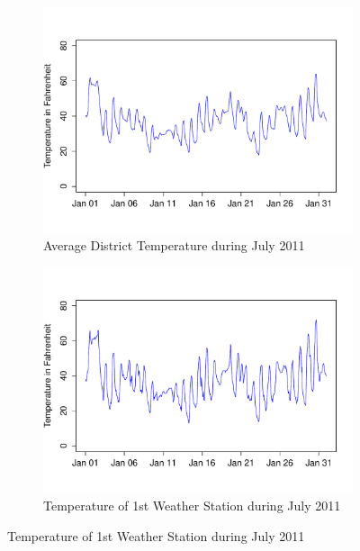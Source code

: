 \documentclass[conference]{IEEEtran}
\begin{document}
\begin{figure}[!ht]
\centering
\begin{subfigure}[b]{.8\linewidth}
\includegraphics[width=\linewidth]{gfx/avg-temp-2011.pdf}
\caption{Average District Temperature during July 2011}
\label{subfig:avg-temp-2012}
\end{subfigure}
\quad
\begin{subfigure}[b]{.8\linewidth}
\includegraphics[width=\linewidth]{gfx/temp-station1-2011.pdf}
\caption{Temperature of 1st Weather Station during July 2011}
\label{subfig:temp-station1-2012}
\end{subfigure}
\end{figure}
\end{document}
